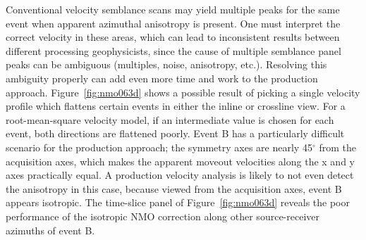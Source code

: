 Conventional velocity semblance scans may yield multiple peaks for the same event when apparent azimuthal anisotropy is present. One must interpret the correct velocity in these areas, which can lead to inconsistent results between different processing geophysicists, since the cause of multiple semblance panel peaks can be ambiguous (multiples, noise, anisotropy, etc.).  Resolving this ambiguity properly can add even more time and work to the production approach.  Figure~\ref{fig:nmo063d} shows a possible result of picking a single velocity profile which flattens certain events in either the inline or crossline view.  For a root-mean-square velocity model, if an intermediate value is chosen for each event, both directions are flattened poorly.  Event B has a particularly difficult scenario for the production approach; the symmetry axes are nearly 45$^\circ $ from the acquisition axes, which makes the apparent moveout velocities along the x and y axes practically equal.  A production velocity analysis is likely to not even detect the anisotropy in this case, because viewed from the acquisition axes, event B appears isotropic.  The time-slice panel of Figure~\ref{fig:nmo063d} reveals the poor performance of the isotropic NMO correction along other source-receiver azimuths of event B.

